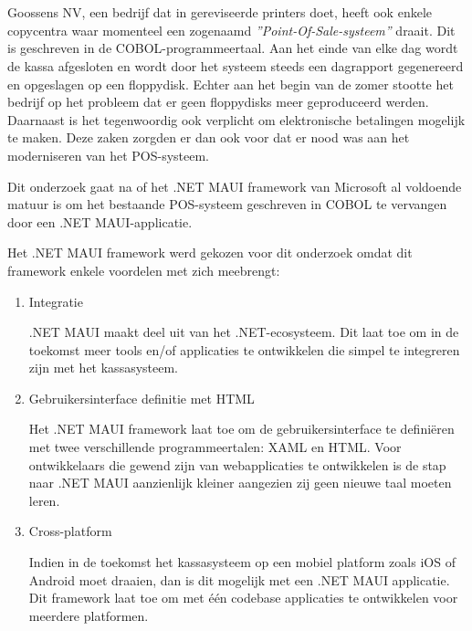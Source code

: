 
\chapter{}%
\label{ch:inleiding}

\section{}%
\label{sec:probleemstelling}

Goossens NV, een bedrijf dat in gereviseerde printers doet, heeft ook enkele copycentra waar momenteel een zogenaamd \emph{''Point-Of-Sale-systeem''} draait. Dit is geschreven in de COBOL-programmeertaal. Aan het einde van elke dag wordt de kassa afgesloten en wordt door het systeem steeds een dagrapport gegenereerd en opgeslagen op een floppydisk. Echter aan het begin van de zomer stootte het bedrijf op het probleem dat er geen floppydisks meer geproduceerd werden. Daarnaast is het tegenwoordig ook verplicht om elektronische betalingen mogelijk te maken. Deze zaken zorgden er dan ook voor dat er nood was aan het moderniseren van het POS-systeem.

Dit onderzoek gaat na of het .NET MAUI framework van Microsoft al voldoende matuur is om het bestaande POS-systeem geschreven in COBOL te vervangen door een .NET MAUI-applicatie.

Het .NET MAUI framework werd gekozen voor dit onderzoek omdat dit framework enkele voordelen met zich meebrengt:

\begin{enumerate}
    \item Integratie
    
    .NET MAUI maakt deel uit van het .NET-ecosysteem. Dit laat toe om in de toekomst meer tools en/of applicaties te ontwikkelen die simpel te integreren zijn met het kassasysteem.
    
    \item Gebruikersinterface definitie met HTML
    
    Het .NET MAUI framework laat toe om de gebruikersinterface te definiëren met twee verschillende programmeertalen: XAML en HTML. Voor ontwikkelaars die gewend zijn van webapplicaties te ontwikkelen is de stap naar .NET MAUI aanzienlijk kleiner aangezien zij geen nieuwe taal moeten leren.
    
    \item Cross-platform
    
    Indien in de toekomst het kassasysteem op een mobiel platform zoals iOS of Android moet draaien, dan is dit mogelijk met een .NET MAUI applicatie. Dit framework laat toe om met één codebase applicaties te ontwikkelen voor meerdere platformen.
\end{enumerate}

